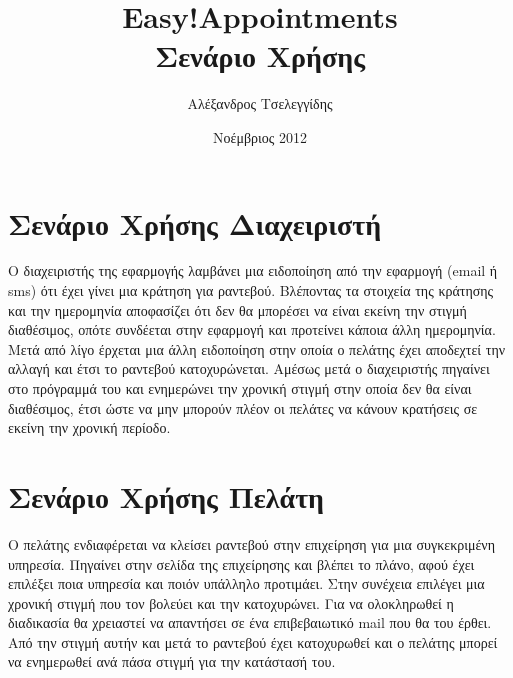 \documentclass[12pt]{article}
\title{{\Huge {\bf Easy!Appointments}} \\[0.3cm] Σενάριο Χρήσης}
\author{Αλέξανδρος Τσελεγγίδης}
\date{Νοέμβριος 2012}
\begin{document}
\maketitle 
\thispagestyle{empty} %
\pagebreak

\section{Σενάριο Χρήσης Διαχειριστή}
Ο διαχειριστής της εφαρμογής λαμβάνει μια ειδοποίηση από την εφαρμογή (email ή sms) ότι έχει γίνει μια κράτηση για ραντεβού. Βλέποντας τα στοιχεία της κράτησης και την ημερομηνία αποφασίζει ότι δεν θα μπορέσει να είναι εκείνη την στιγμή διαθέσιμος, οπότε συνδέεται στην εφαρμογή και προτείνει κάποια άλλη ημερομηνία. Μετά από λίγο έρχεται μια άλλη ειδοποίηση στην οποία ο πελάτης έχει αποδεχτεί την αλλαγή και έτσι το ραντεβού κατοχυρώνεται. Αμέσως μετά ο διαχειριστής πηγαίνει στο πρόγραμμά του και ενημερώνει την χρονική στιγμή στην οποία δεν θα είναι διαθέσιμος, έτσι ώστε να μην μπορούν πλέον οι πελάτες να κάνουν κρατήσεις σε εκείνη την χρονική περίοδο.

\section{Σενάριο Χρήσης Πελάτη}
Ο πελάτης ενδιαφέρεται να κλείσει ραντεβού στην επιχείρηση για μια συγκεκριμένη υπηρεσία. Πηγαίνει στην σελίδα της επιχείρησης και βλέπει το πλάνο, αφού έχει επιλέξει ποια υπηρεσία και ποιόν υπάλληλο προτιμάει. Στην συνέχεια επιλέγει μια χρονική στιγμή που τον βολεύει και την κατοχυρώνει. Για να ολοκληρωθεί η διαδικασία θα χρειαστεί να απαντήσει σε ένα επιβεβαιωτικό mail που θα του έρθει. Από την στιγμή αυτήν και μετά το ραντεβού έχει κατοχυρωθεί και ο πελάτης μπορεί να ενημερωθεί ανά πάσα στιγμή για την κατάστασή του.
\end{document}
